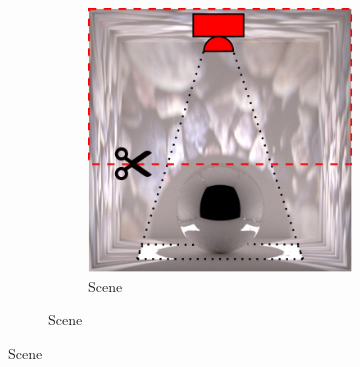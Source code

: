 \begin{figure}[]
    \centering    
    \begin{subfigure}{\textwidth}
        \centering
        \begin{subfigure}{0.5\textwidth}
            \centering
            \includegraphics[width=\textwidth]{images/04-experiment03/ball_dof/scene_highlighted.jpg}
            \caption*{Scene}
        \end{subfigure}


\end{subfigure}
\end{figure}

